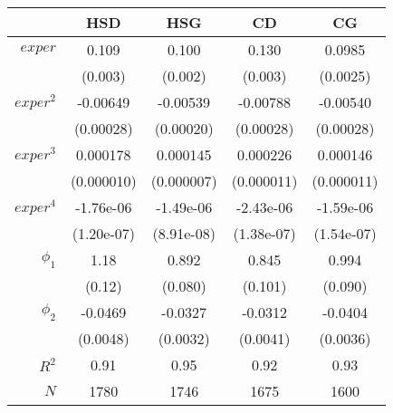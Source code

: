 \begin{tabular}{rSSSS}
\hline
 & {HSD} & {HSG} & {CD} & {CG} \\ 
\hline
$exper$ & 0.109 & 0.100 & 0.130 & 0.0985 \\ 
 & (0.003) & (0.002) & (0.003) & (0.0025) \\ 
$exper^2$ & -0.00649 & -0.00539 & -0.00788 & -0.00540 \\ 
 & (0.00028) & (0.00020) & (0.00028) & (0.00028) \\ 
$exper^3$ & 0.000178 & 0.000145 & 0.000226 & 0.000146 \\ 
 & (0.000010) & (0.000007) & (0.000011) & (0.000011) \\ 
$exper^4$ & -1.76e-06 & -1.49e-06 & -2.43e-06 & -1.59e-06 \\ 
 & (1.20e-07) & (8.91e-08) & (1.38e-07) & (1.54e-07) \\ 
$\phi_{1}$ & 1.18 & 0.892 & 0.845 & 0.994 \\ 
 & (0.12) & (0.080) & (0.101) & (0.090) \\ 
$\phi_{2}$ & -0.0469 & -0.0327 & -0.0312 & -0.0404 \\ 
 & (0.0048) & (0.0032) & (0.0041) & (0.0036) \\ 
$R^2$ & 0.91 & 0.95 & 0.92 & 0.93 \\ 
$N$ & 1780 & 1746 & 1675 & 1600 \\ 
\hline
\end{tabular}%
